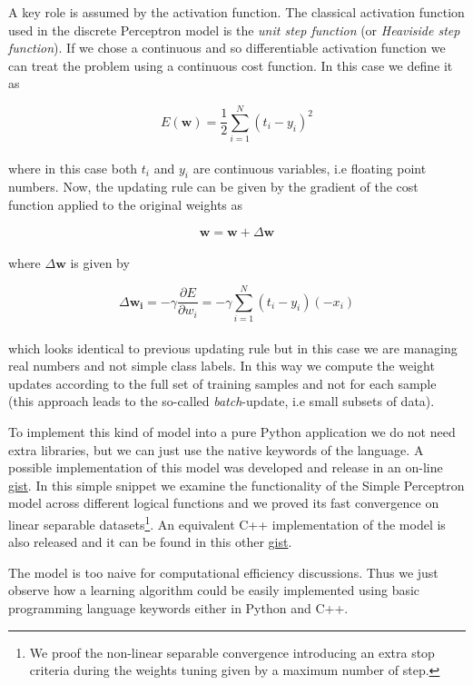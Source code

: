 \documentclass{standalone}
\begin{document}
A key role is assumed by the activation function.
The classical activation function used in the discrete Perceptron model is the \emph{unit step function} (or \emph{Heaviside step function}).
If we chose a continuous and so differentiable activation function we can treat the problem using a continuous cost function.
In this case we define it as

$$
E(\mathbf{w}) = \frac{1}{2}\sum_{i=1}^{N}\left( t_i - y_i \right)^2
$$
\\
where in this case both $t_i$ and $y_i$ are continuous variables, i.e floating point numbers.
Now, the updating rule can be given by the gradient of the cost function applied to the original weights as

$$
\mathbf{w} = \mathbf{w} + \Delta\mathbf{w}
$$
\\
where $\Delta\mathbf{w}$ is given by

$$
\Delta\mathbf{w_i} = -\gamma\frac{\partial E}{\partial w_i} = -\gamma\sum_{i=1}^{N} \left( t_i - y_i \right)\left(-x_i \right)
$$
\\
which looks identical to previous updating rule but in this case we are managing real numbers and not simple class labels.
In this way we compute the weight updates according to the full set of training samples and not for each sample (this approach leads to the so-called \emph{batch}-update, i.e small subsets of data).

To implement this kind of model into a pure \textsf{Python} application we do not need extra libraries, but we can just use the native keywords of the language.
A possible implementation of this model was developed and release in an on-line \href{https://gist.github.com/Nico-Curti/358b7a2ffed1abbb57ee87a5338ca073}{gist}.
In this simple snippet we examine the functionality of the Simple Perceptron model across different logical functions and we proved its fast convergence on linear separable datasets\footnote{
  We proof the non-linear separable convergence introducing an extra stop criteria during the weights tuning given by a maximum number of step.
}.
An equivalent \textsf{C++} implementation of the model is also released and it can be found in this other \href{https://gist.github.com/Nico-Curti/856c3baf523bc5d01b1e7dfe2515c0e2}{gist}.

The model is too naive for computational efficiency discussions.
Thus we just observe how a learning algorithm could be easily implemented using basic programming language keywords either in \textsf{Python} and \textsf{C++}.
\end{document}
